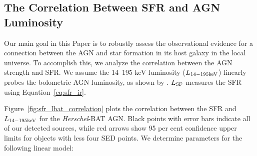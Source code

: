 \documentclass[fleqn, usenatbib]{mnras}
\newcommand{\herschel}{\emph{Herschel}}
\begin{document}
%
%
 
\subsection{The Correlation Between SFR and AGN Luminosity}
Our main goal in this Paper is to robustly assess the observational evidence for a connection between the AGN and star formation in its host galaxy in the local universe. To accomplish this, we analyze the correlation between the AGN strength and SFR. We assume the 14--195 keV luminosity ($L_{\rm 14-195 keV}$) linearly probes the bolometric AGN luminosity, as shown by \citet{Winter:2012yq}. $L_{\rm SF}$ measures the SFR using Equation~\ref{eq:sfr_ir}.

Figure~\ref{fig:sfr_lbat_correlation} plots the correlation between the SFR and $L_{\rm 14-195 keV}$ for the \herschel-BAT AGN. Black points with error bars indicate all of our detected sources, while red arrows show 95 per cent confidence upper limits for objects with less four SED points. We determine parameters for the following linear model:
\end{document}
